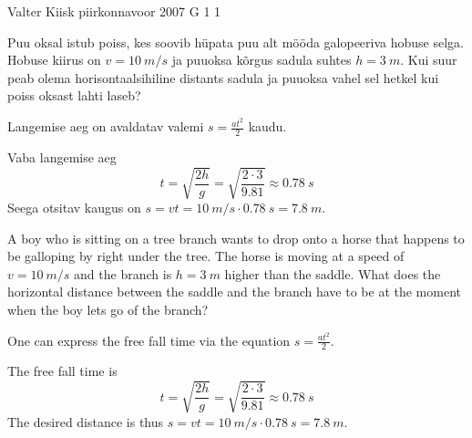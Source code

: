 {Valter Kiisk} %
{piirkonnavoor} %
{2007} %
{G 1} %
{1} %
{
\ifStatement
Puu oksal istub poiss, kes soovib hüpata puu alt mööda galopeeriva hobuse selga. Hobuse kiirus on $v = \SI{10}{m/s}$ ja puuoksa kõrgus sadula suhtes $h = \SI{3}{m}$. Kui suur peab olema horisontaalsihiline distants sadula ja puuoksa vahel sel hetkel kui poiss oksast lahti laseb?
\fi


\ifHint
Langemise aeg on avaldatav valemi $s = \frac{at^2}{2}$ kaudu.
\fi


\ifSolution
Vaba langemise aeg
\[
t=\sqrt{\frac{2 h}{g}}=\sqrt{\frac{2 \cdot 3}{\num{9,81}}} \approx \SI{0,78}{s}
\]
Seega otsitav kaugus on $s = vt = \SI{10}{m/s} \cdot \SI{0,78}{s} = \SI{7,8}{m}$.
\fi


\ifEngStatement
A boy who is sitting on a tree branch wants to drop onto a horse that happens to be galloping by right under the tree. The horse is moving at a speed of $v = \SI{10}{m/s}$ and the branch is $h = \SI{3}{m}$ higher than the saddle. What does the horizontal distance between the saddle and the branch have to be at the moment when the boy lets go of the branch?
\fi


\ifEngHint
One can express the free fall time via the equation $s = \frac{at^2}{2}$.
\fi


\ifEngSolution
The free fall time is 
\[
t=\sqrt{\frac{2 h}{g}}=\sqrt{\frac{2 \cdot 3}{\num{9,81}}} \approx \SI{0,78}{s}
\]
The desired distance is thus $s = vt = \SI{10}{m/s} \cdot \SI{0,78}{s} = \SI{7,8}{m}$.
\fi
}
